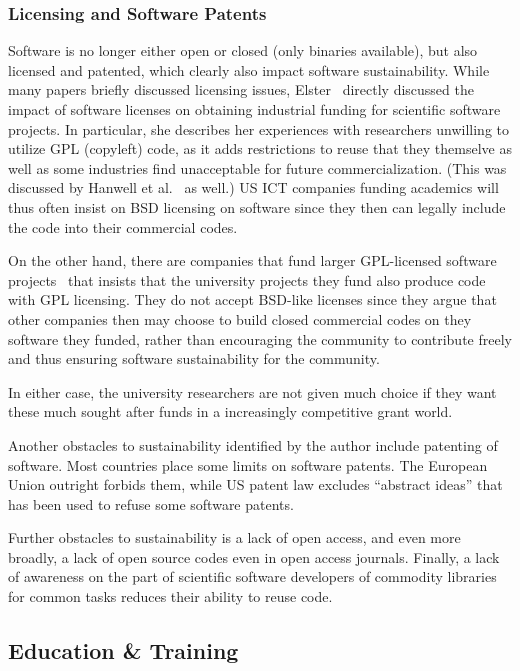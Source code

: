 \documentclass[11pt, oneside]{amsart}
\begin{document}
\subsubsection{Licensing and Software Patents}
Software is no longer either open or closed (only binaries available),
but also licensed and patented, which clearly also impact 
software sustainability.
While many papers briefly discussed licensing issues,
Elster~\cite{Elster_WSSSPE} directly discussed the impact of software licenses 
on obtaining industrial funding for scientific software
projects.  In particular, she describes her experiences with researchers
unwilling to utilize GPL (copyleft) code, as it adds restrictions to
reuse that they themselve as well as some industries find unacceptable for future
commercialization.  (This was discussed by Hanwell et
al.~\cite{Hanwell_WSSSPE} as well.)  US ICT companies funding 
academics will thus often insist on BSD licensing on software 
since they then can legally include the code into their commercial
codes.

On the other hand, there are companies
that fund larger GPL-licensed software projects~\cite{Blatt_WSSSPE}
that insists that the university projects they fund 
also produce code with GPL licensing.
They do not accept BSD-like licenses since they argue that
other companies then may choose to build closed commercial
codes on they software they funded, rather than encouraging 
the community to contribute freely and thus ensuring software 
sustainability for the community.

In either case, the university researchers are not given much choice
if they want these much sought after funds in a increasingly competitive
grant world.

Another obstacles to
sustainability identified by the author include patenting of software.
Most countries place some limits on software patents. The European 
Union outright forbids them, while US patent law excludes “abstract ideas” 
that has been used to refuse some software patents.


Further obstacles to
sustainability is a lack of open access, and even more broadly, a lack of open source
codes even in open access journals.  Finally, a lack of awareness on
the part of scientific software developers of commodity libraries for
common tasks reduces their ability to reuse code.

\subsection{Education \& Training}
\end{document}
